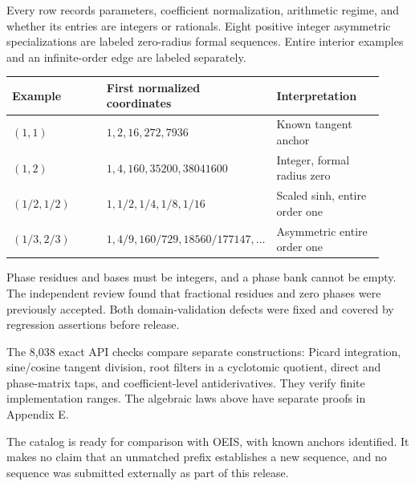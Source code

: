 Every row records parameters, coefficient normalization, arithmetic regime,
and whether its entries are integers or rationals. Eight positive integer
asymmetric specializations are labeled zero-radius formal sequences. Entire
interior examples and an infinite-order edge are labeled separately.

\begin{tabular}{@{}p{0.27\linewidth}p{0.35\linewidth}p{0.30\linewidth}@{}}
\toprule
Example & First normalized coordinates & Interpretation\\\midrule
$(1,1)$ & $1,2,16,272,7936$ & Known tangent anchor\\
$(1,2)$ & $1,4,160,35200,38041600$ & Integer, formal radius zero\\
$(1/2,1/2)$ & $1,1/2,1/4,1/8,1/16$ & Scaled sinh, entire order one\\
$(1/3,2/3)$ & $1,4/9,160/729,18560/177147,\ldots$ & Asymmetric entire order one\\
\bottomrule
\end{tabular}

Phase residues and bases must be integers, and a phase bank cannot be empty.
The independent review found that fractional residues and zero phases were
previously accepted. Both domain-validation defects were fixed and covered
by regression assertions before release.

The 8,038 exact API checks compare separate constructions: Picard integration,
sine/cosine tangent division, root filters in a cyclotomic quotient,
direct and phase-matrix taps, and coefficient-level antiderivatives.
They verify finite implementation ranges. The algebraic laws above have
separate proofs in Appendix E.

The catalog is ready for comparison with OEIS, with known anchors identified.
It makes no claim that an unmatched prefix establishes a new sequence, and
no sequence was submitted externally as part of this release.
